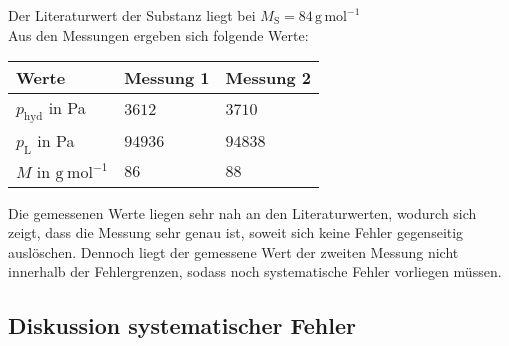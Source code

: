 \documentclass[12pt,a4paper,titlepage,headinclude,bibtotoc]{scrartcl}
\begin{document}
Der Literaturwert der Substanz liegt bei 
$M_\mathrm{S} = 84\, \mathrm{g\,mol^{-1}}$
\\


Aus den Messungen ergeben sich folgende Werte:\\


\begin{table} [h]
\centering
\begin{tabular}{|p{4 cm}||p{4 cm}|p{4 cm}|}
        \hline
		Werte & Messung 1 & Messung 2\\
         \hline 
        $ p_\mathrm{hyd}$ in Pa & $3612$  & $3710$ \\
        \hline
        $ p_\mathrm{L}   $ in Pa & $94936$  & $94838$ \\
        \hline
        $ M $ in $\mathrm{g{~}mol^{-1}}$ & $86$ & $88$ \\
        \hline     
\end{tabular}
\end{table}

Die gemessenen Werte liegen sehr nah an den Literaturwerten, wodurch sich zeigt, dass die Messung sehr genau ist, soweit sich keine Fehler gegenseitig auslöschen. Dennoch liegt der gemessene Wert der zweiten Messung nicht innerhalb der Fehlergrenzen, sodass noch systematische Fehler vorliegen müssen.

\subsection{Diskussion systematischer Fehler}
\end{document}
